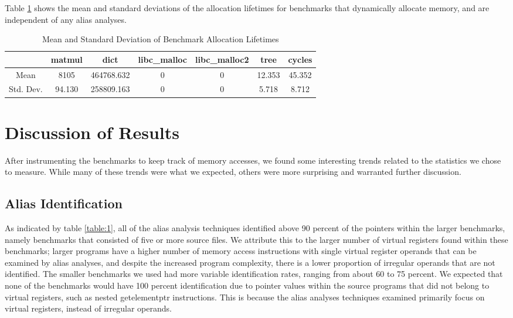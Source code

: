 Table \ref{table:6} shows the mean and standard deviations of the allocation lifetimes for benchmarks that dynamically allocate memory, and are independent of any alias analyses.

\begin{table} [h!]
\centering
   \begin{tabular} {|c|c c c c c c|}
      \hline
      & matmul & dict & libc\_malloc & libc\_malloc2 & tree & cycles \\
      \hline
      Mean & 8105 & 464768.632 & 0 & 0 & 12.353 & 45.352 \\
      \hline
      Std. Dev. & 94.130 & 258809.163 & 0 & 0 & 5.718 & 8.712 \\
      \hline
   \end{tabular}
   \caption{Mean and Standard Deviation of Benchmark Allocation Lifetimes}
   \label{table:6}
\end{table}

\section{Discussion of Results}
After instrumenting the benchmarks to keep track of memory accesses, we found some interesting trends related to the statistics we chose to measure. While many of these trends were what we expected, others were more surprising and warranted further discussion.

\subsection{Alias Identification}
As indicated by table \ref{table:1}, all of the alias analysis techniques identified above 90 percent of the pointers within the larger benchmarks, namely benchmarks that consisted of five or more source files. We attribute this to the larger number of virtual registers found within these benchmarks; larger programs have a higher number of memory access instructions with single virtual register operands that can be examined by alias analyses, and despite the increased program complexity, there is a lower proportion of irregular operands that are not identified. The smaller benchmarks we used had more variable identification rates, ranging from about 60 to 75 percent. We expected that none of the benchmarks would have 100 percent identification due to pointer values within the source programs that did not belong to virtual registers, such as nested getelementptr instructions. This is because the alias analyses techniques examined primarily focus on virtual registers, instead of irregular operands.

